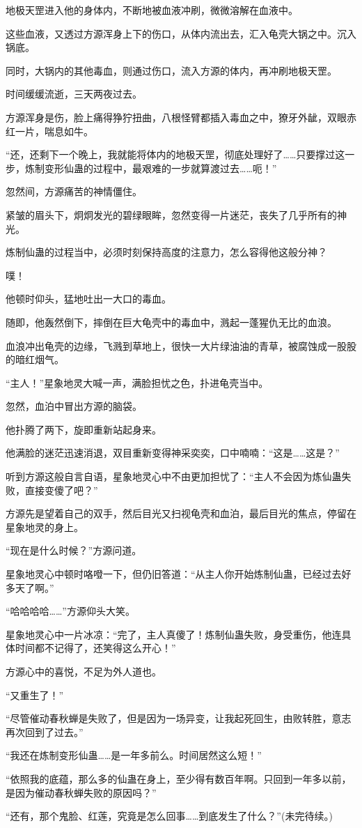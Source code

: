 \begin{this_body}
地极天罡进入他的身体内，不断地被血液冲刷，微微溶解在血液中。

这些血液，又透过方源浑身上下的伤口，从体内流出去，汇入龟壳大锅之中。沉入锅底。

同时，大锅内的其他毒血，则通过伤口，流入方源的体内，再冲刷地极天罡。

时间缓缓流逝，三天两夜过去。

方源浑身是伤，脸上痛得狰狞扭曲，八根怪臂都插入毒血之中，獠牙外龇，双眼赤红一片，喘息如牛。

“还，还剩下一个晚上，我就能将体内的地极天罡，彻底处理好了……只要撑过这一步，炼制变形仙蛊的过程中，最艰难的一步就算渡过去……呃！”

忽然间，方源痛苦的神情僵住。

紧皱的眉头下，炯炯发光的碧绿眼眸，忽然变得一片迷茫，丧失了几乎所有的神光。

炼制仙蛊的过程当中，必须时刻保持高度的注意力，怎么容得他这般分神？

噗！

他顿时仰头，猛地吐出一大口的毒血。

随即，他轰然倒下，摔倒在巨大龟壳中的毒血中，溅起一蓬猩仇无比的血浪。

血浪冲出龟壳的边缘，飞溅到草地上，很快一大片绿油油的青草，被腐蚀成一股股的暗红烟气。

“主人！”星象地灵大喊一声，满脸担忧之色，扑进龟壳当中。

忽然，血泊中冒出方源的脑袋。

他扑腾了两下，旋即重新站起身来。

他满脸的迷茫迅速消退，双目重新变得神采奕奕，口中喃喃：“这是……这是？”

听到方源这般自言自语，星象地灵心中不由更加担忧了：“主人不会因为炼仙蛊失败，直接变傻了吧？”

方源先是望着自己的双手，然后目光又扫视龟壳和血泊，最后目光的焦点，停留在星象地灵的身上。

“现在是什么时候？”方源问道。

星象地灵心中顿时咯噔一下，但仍旧答道：“从主人你开始炼制仙蛊，已经过去好多天了啊。”

“哈哈哈哈……”方源仰头大笑。

星象地灵心中一片冰凉：“完了，主人真傻了！炼制仙蛊失败，身受重伤，他连具体时间都不记得了，还笑得这么开心！”

方源心中的喜悦，不足为外人道也。

“又重生了！”

“尽管催动春秋蝉是失败了，但是因为一场异变，让我起死回生，由败转胜，意志再次回到了过去。”

“我还在炼制变形仙蛊……是一年多前么。时间居然这么短！”

“依照我的底蕴，那么多的仙蛊在身上，至少得有数百年啊。只回到一年多以前，是因为催动春秋蝉失败的原因吗？”

“还有，那个鬼脸、红莲，究竟是怎么回事……到底发生了什么？”(未完待续。)

\end{this_body}

